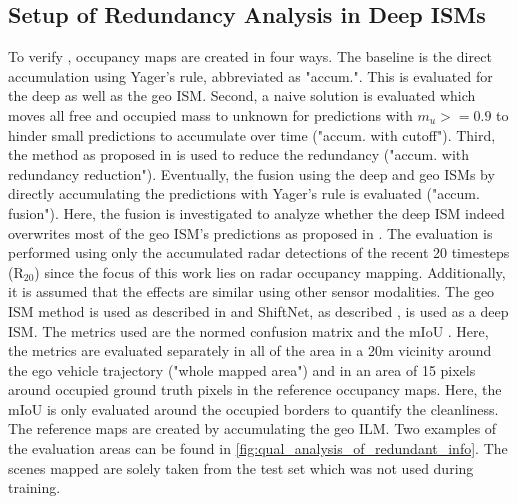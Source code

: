 \subsection{Setup of Redundancy Analysis in Deep ISMs}
\label{subsec:setup_of_red_analy}
To verify , occupancy maps are created in four ways. The baseline is the direct accumulation using Yager's rule, abbreviated as "accum.". This is evaluated for the deep as well as the geo ISM. Second, a naive solution is evaluated which moves all free and occupied mass to unknown for predictions with $m_u>=0.9$ to hinder small predictions to accumulate over time ("accum. with cutoff"). Third, the method as proposed in  is used to reduce the redundancy ("accum. with redundancy reduction"). Eventually, the fusion using the deep and geo ISMs by directly accumulating the predictions with Yager's rule is evaluated ("accum. fusion"). Here, the fusion is investigated to analyze whether the deep ISM indeed overwrites most of the geo ISM's predictions as proposed in .
%
The evaluation is performed using only the accumulated radar detections of the recent 20 timesteps (R$_{20}$) since the focus of this work lies on radar occupancy mapping. Additionally, it is assumed that the effects are similar using other sensor modalities. The geo ISM method is used as described in  and ShiftNet, as described , is used as a deep ISM.
%
The metrics used are the normed confusion matrix  and the mIoU . Here, the metrics are evaluated separately in all of the area in a 20m vicinity around the ego vehicle trajectory ("whole mapped area") and in an area of 15 pixels around occupied ground truth pixels in the reference occupancy maps. Here, the mIoU is only evaluated around the occupied borders to quantify the cleanliness. The reference maps are created by accumulating the geo ILM. Two examples of the evaluation areas can be found in \ref{fig:qual_analysis_of_redundant_info}. The scenes mapped are solely taken from the test set which was not used during training.
%
